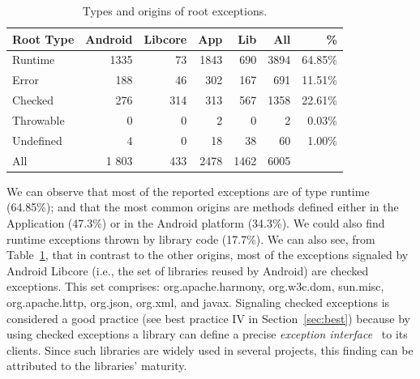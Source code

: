 \begin{table}
\scriptsize
\centering
\begin{tabular}{lrrrrrr}
    \hline
    \bfseries{Root Type} & \bfseries{Android} & \bfseries{Libcore} & \bfseries{App} & \bfseries{Lib}  & \bfseries{All} & \bfseries{\%} \\
    \hline

Runtime	&	1335	&	73	&	1843	&	690  &	3894 & 64.85\% \\  %
Error	       &	 188              &	 46	&	302             &	167	           &	691 & 11.51\%	\\
Checked	&	276           &	314	&	313          &	567	           &	1358 & 22.61\%	\\
Throwable	&	0	       &	0	&	2            &	0         &	2 & 0.03\%	\\
Undefined	&	4	&	0	&	18		&	38	   &	60	& 1.00\% \\
 \hline
All		& 1  803	&	433	&	2478	&	1462	&	6005 	\\
    \hline
  \end{tabular}
\caption{Types and origins of root exceptions.}
  \label{tab:typeroottab}
\end{table}

\bigskip

We can observe that most of the reported exceptions are of type runtime
(64.85\%); and that the most common origins are methods defined either in the Application (47.3\%)
or in the Android platform (34.3\%). We could also find runtime exceptions thrown by library code (17.7\%).
 We can also see, from Table~\ref{tab:typeroottab}, that in contrast to the other origins, most of the
 exceptions signaled by Android Libcore (i.e., the set of libraries reused by Android) are
checked exceptions. This set comprises: org.apache.harmony, org.w3c.dom, sun.misc,
org.apache.http, org.json, org.xml, and javax. Signaling checked exceptions is considered a
good practice (see best practice IV in Section~\ref{sec:best}) because by using
checked exceptions a library can define a precise
\emph{exception interface}~\cite{miller1997issues} to its clients.
 Since such libraries are widely used  in several projects, this
 finding can be attributed to the libraries' maturity.



\bigskip

